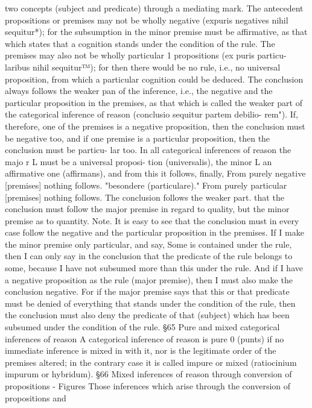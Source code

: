 two concepts (subject and predicate) through a mediating mark.
The antecedent propositions or premises may not be wholly negative (expuris
negatives nihil sequitur*); for the subsumption in the minor premise must be
affirmative, as that which states that a cognition stands under the condition of
the rule.
The premises may also not be wholly particular 1 propositions (ex puris particu-
laribus nihil sequitur™); for then there would be no rule, i.e., no universal
proposition, from which a particular cognition could be deduced.
The conclusion always follows the weaker pan of the inference, i.e., the negative and
the particular proposition in the premises, as that which is called the weaker
part of the categorical inference of reason (conclusio sequitur partem debilio-
rem"). If, therefore,
one of the premises is a negative proposition, then the conclusion must be
negative too, and
if one premise is a particular proposition, then the conclusion must be particu-
lar too.
In all categorical inferences of reason the majo r L must be a universal proposi-
tion (universalis), the minor L an affirmative one (affirmans), and from this it
follows, finally,
From purely negative [premises] nothing follows.
"besondere (particulare)."
From purely particular [premises] nothing follows.
The conclusion follows the weaker part.
that the conclusion must follow the major premise in regard to quality, but the
minor premise as to quantity.
Note.
It is easy to see that the conclusion must in every case follow the negative
and the particular proposition in the premises.
If I make the minor premise only particular, and say, Some is contained
under the rule, then I can only say in the conclusion that the predicate of
the rule belongs to some, because I have not subsumed more than this under
the rule. And if I have a negative proposition as the rule (major premise),
then I must also make the conclusion negative. For if the major premise
says that this or that predicate must be denied of everything that stands
under the condition of the rule, then the conclusion must also deny the
predicate of that (subject) which has been subsumed under the condition
of the rule.
§65
Pure and mixed categorical inferences of reason
A categorical inference of reason is pure 0 (punts) if no immediate inference
is mixed in with it, nor is the legitimate order of the premises altered; in
the contrary case it is called impure or mixed (ratiocinium impurum or
hybridum).
§66
Mixed inferences of reason through conversion of
propositions - Figures
Those inferences which arise through the conversion of propositions and
